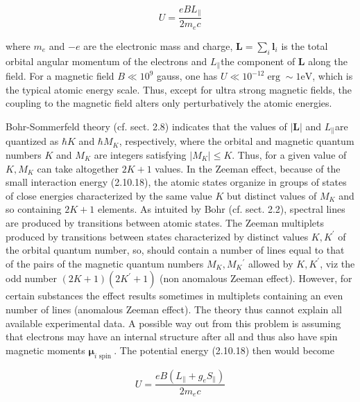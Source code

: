 \documentclass{article}
\begin{document}
\begin{equation*}
U=\frac{e B L_{\|}}{2 m_{e} c} \tag{2.10.18}
\end{equation*}
 
where $m_{e}$ and $-e$ are the electronic mass and charge, $\boldsymbol{L}=\sum_{i} \boldsymbol{l}_{i}$ is the total orbital angular momentum of the electrons and $L_{\|}$the component of $\boldsymbol{L}$ along the field. For a magnetic field $B \ll 10^{9}$ gauss, one has $U \ll 10^{-12} \operatorname{erg} \sim 1 \mathrm{eV}$, which is the typical atomic energy scale. Thus, except for ultra strong magnetic fields, the coupling to the magnetic field alters only perturbatively the atomic energies.

Bohr-Sommerfeld theory (cf. sect. 2.8) indicates that the values of $|\boldsymbol{L}|$ and $L_{\|}$are quantized as $\hbar K$ and $\hbar M_{K}$, respectively, where the orbital and magnetic quantum numbers $K$ and $M_{K}$ are integers satisfying $\left|M_{K}\right| \leq K$. Thus, for a given value of $K, M_{K}$ can take altogether $2 K+1$ values. In the Zeeman effect, because of the small interaction energy (2.10.18), the atomic states organize in groups of states of close energies characterized by the same value $K$ but distinct values of $M_{K}$ and so containing $2 K+1$ elements. As intuited by Bohr (cf. sect. 2.2), spectral lines are produced by transitions between atomic states. The Zeeman multiplets produced by transitions between states characterized by distinct values $K, K^{\prime}$ of the orbital quantum number, so, should contain a number of lines equal to that of the pairs of the magnetic quantum numbers $M_{K}, M_{K}{ }^{\prime}$ allowed by $K, K^{\prime}$, viz the odd number $(2 K+1)\left(2 K^{\prime}+1\right)$ (non anomalous Zeeman effect). However, for certain substances the effect results sometimes in multiplets containing an even number of lines (anomalous Zeeman effect). The theory thus cannot explain all available experimental data. A possible way out from this problem is assuming that electrons may have an internal structure after all and thus also have spin magnetic moments $\boldsymbol{\mu}_{i \text { spin }}$. The potential energy (2.10.18) then would become
 
\begin{equation*}
U=\frac{e B\left(L_{\|}+g_{e} S_{\|}\right)}{2 m_{e} c} \tag{2.10.19}
\end{equation*}
 
\end{document}
